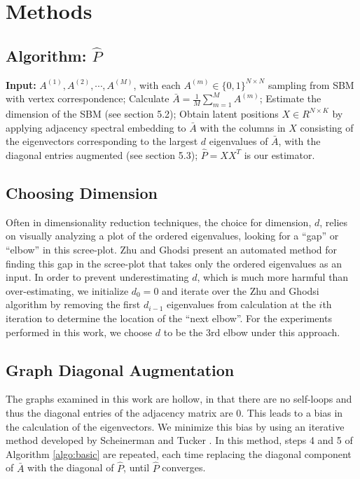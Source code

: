 
\section{Methods}

	\subsection{Algorithm: $\hat{P}$}

\begin{algorithm}[H]
\caption{}
\label{algo:basic}
\begin{algorithmic}[1]
    \STATE \textbf{Input:} $A^{(1)}, A^{(2)}, \cdots, A^{(M)}$, with each $A^{(m)} \in \{0,1\}^{N \times N}$ sampling from SBM with vertex correspondence;
    \STATE Calculate $\bar{A} = \frac{1}{M}\sum\limits_{m = 1}^M A^{(m)}$;
	\STATE Estimate the dimension of the SBM (see section 5.2);
	\STATE Obtain latent positions $X \in R^{N \times K}$ by applying adjacency spectral embedding to $\bar{A}$ with the columns in $X$ consisting of the eigenvectors corresponding to the largest $d$ eigenvalues of $\bar{A}$, with the diagonal entries augmented (see section 5.3);
    \STATE $\hat{P} = XX^{T}$ is our estimator.
\end{algorithmic}
\end{algorithm}


	\subsection{Choosing Dimension}
	Often in dimensionality reduction techniques, the choice for dimension, $d$, relies on visually analyzing a plot of the ordered eigenvalues, looking for a ``gap'' or ``elbow'' in this scree-plot.  Zhu and Ghodsi \cite{Zhu2006} present an automated method for finding this gap in the scree-plot that takes only the ordered eigenvalues as an input.  In order to prevent underestimating $d$, which is much more harmful than over-estimating, we initialize $d_0 = 0$ and iterate over the Zhu and Ghodsi algorithm by removing the first $d_{i-1}$ eigenvalues from calculation at the $i$th iteration to determine the location of the ``next elbow''.  For the experiments performed in this work, we choose $d$ to be the 3rd elbow under this approach.
	
	
	\subsection{Graph Diagonal Augmentation}
	The graphs examined in this work are hollow, in that there are no self-loops and thus the diagonal entries of the adjacency matrix are 0.  This leads to a bias in the calculation of the eigenvectors.  We minimize this bias by using an iterative method developed by Scheinerman and Tucker \cite{Scheinerman2010}. In this method, steps 4 and 5 of Algorithm \ref{algo:basic} are repeated, each time replacing the diagonal component of $\bar{A}$ with the diagonal of $\hat{P}$, until $\hat{P}$ converges.

